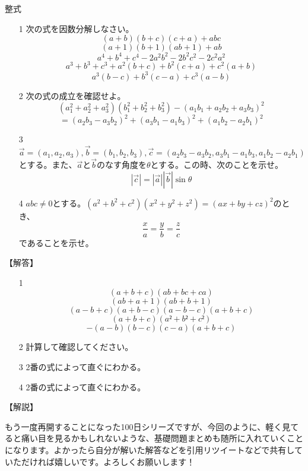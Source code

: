 \documentclass[a4paper,fleqn,dvipdfmx]{jsarticle}
\begin{document}
\newpage
\begin{itembox}[l]{整式}
    \begin{itemize}
        \item [1]
        次の式を因数分解しなさい。
        $$(a+b)(b+c)(c+a)+abc$$
        $$(a+1)(b+1)(ab+1)+ab$$
        $$a^4+b^4+c^4-2a^2b^2-2b^2c^2-2c^2a^2$$
        $$a^3+b^3+c^3+a^2(b+c)+b^2(c+a)+c^2(a+b)$$
        $$a^3(b-c)+b^3(c-a)+c^3(a-b)$$
        \item [2]
        次の式の成立を確認せよ。
        $$(a_1^2+a_2^2+a_3^2)(b_1^2+b_2^2+b_3^2)-(a_1b_1+a_2b_2+a_3b_3)^2$$
        $$=(a_2b_3-a_3b_2)^2+(a_3b_1-a_1b_3)^2+(a_1b_2-a_2b_1)^2$$
        \item [3] 
        $\overrightarrow{a}=(a_1,a_2,a_3),\overrightarrow{b}=(b_1,b_2,b_3),\overrightarrow{c}=(a_2b_3-a_3b_2,a_3b_1-a_1b_3,a_1b_2-a_2b_1)$とする。また、$\overrightarrow{a}$と$\overrightarrow{b}$のなす角度を$\theta$とする。この時、次のことを示せ。
        $$|\overrightarrow{c}|=|\overrightarrow{a}||\overrightarrow{b}|\sin\theta$$
        \item [4]
        $abc\neq 0$とする。$(a^2+b^2+c^2)(x^2+y^2+z^2)=(ax+by+cz)^2$のとき、$$\frac{x}{a}=\frac{y}{b}=\frac{z}{c}$$
        であることを示せ。
    \end{itemize}
\end{itembox}

\begin{flushleft}
【解答】\dotfill
\end{flushleft}

\begin{itemize}
    \item [1]$$(a+b+c)(ab+bc+ca)$$
    $$(ab+a+1)(ab+b+1)$$
    $$(a-b+c)(a+b-c)(a-b-c)(a+b+c)$$
    $$(a+b+c)(a²+b²+c²)$$
    $$-(a-b)(b-c)(c-a)(a+b+c)$$    
    \item [2]計算して確認してください。
    \item [3]2番の式によって直ぐにわかる。
    \item [4]2番の式によって直ぐにわかる。
\end{itemize}
\dotfill

\begin{flushleft}
    【解説】
\end{flushleft}

もう一度再開することになった100日シリーズですが、今回のように、軽く見てると痛い目を見るかもしれないような、基礎問題まとめも随所に入れていくことになります。よかったら自分が解いた解答などを引用リツイートなどで共有していただければ嬉しいです。よろしくお願いします！
\end{document}
